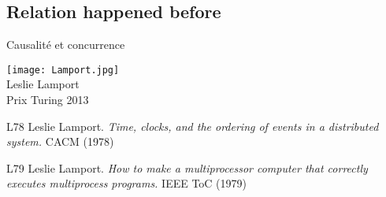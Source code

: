 \subsection{Relation happened before}

\begin{frame}{Causalité et concurrence}
  \vfill
  \begin{center}
     \texttt{[image: Lamport.jpg]}\\
     Leslie Lamport\\
     Prix Turing 2013
  \end{center}
  \vfill
  \begin{citing}
  \item[L78] Leslie Lamport. \textit{Time, clocks, and the ordering of events in a distributed system.} CACM (1978)
  \item[L79] Leslie Lamport. \textit{How to make a multiprocessor computer that correctly executes multiprocess programs.} IEEE ToC (1979)
  \end{citing}
\end{frame}

